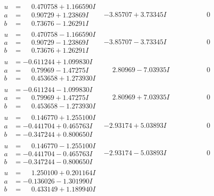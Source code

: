 \documentclass[1p]{elsarticle_modified}
\theoremstyle{definition}
\begin{document}
$$\begin{array}{c|c|c}
\begin{aligned}
u &= \phantom{-}0.470758 + 1.166590 I \\
a &= \phantom{-}0.90729 + 1.23869 I \\
b &= \phantom{-}0.73676 - 1.26291 I\end{aligned}
 & -3.85707 + 3.73345 I & \phantom{-0.000000 } 0 \\ \hline\begin{aligned}
u &= \phantom{-}0.470758 - 1.166590 I \\
a &= \phantom{-}0.90729 - 1.23869 I \\
b &= \phantom{-}0.73676 + 1.26291 I\end{aligned}
 & -3.85707 - 3.73345 I & \phantom{-0.000000 } 0 \\ \hline\begin{aligned}
u &= -0.611244 + 1.099830 I \\
a &= \phantom{-}0.79969 - 1.47275 I \\
b &= \phantom{-}0.453658 + 1.273930 I\end{aligned}
 & \phantom{-}2.80969 - 7.03935 I & \phantom{-0.000000 } 0 \\ \hline\begin{aligned}
u &= -0.611244 - 1.099830 I \\
a &= \phantom{-}0.79969 + 1.47275 I \\
b &= \phantom{-}0.453658 - 1.273930 I\end{aligned}
 & \phantom{-}2.80969 + 7.03935 I & \phantom{-0.000000 } 0 \\ \hline\begin{aligned}
u &= \phantom{-}0.146770 + 1.255100 I \\
a &= -0.441704 + 0.465763 I \\
b &= -0.347244 + 0.800650 I\end{aligned}
 & -2.93174 + 5.03893 I & \phantom{-0.000000 } 0 \\ \hline\begin{aligned}
u &= \phantom{-}0.146770 - 1.255100 I \\
a &= -0.441704 - 0.465763 I \\
b &= -0.347244 - 0.800650 I\end{aligned}
 & -2.93174 - 5.03893 I & \phantom{-0.000000 } 0 \\ \hline\begin{aligned}
u &= \phantom{-}1.250100 + 0.201164 I \\
a &= -0.136026 - 1.301990 I \\
b &= \phantom{-}0.433149 + 1.189940 I\end{aligned}

\end{array}$$
\end{document}
